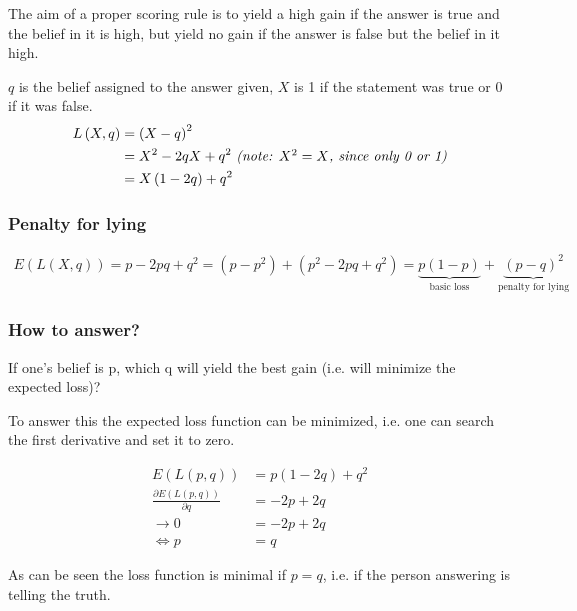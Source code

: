 \vspace{1em}

The aim of a proper scoring rule is to yield a high gain if the answer is true and the belief in it is high, but yield no gain if the answer is false but the belief in it high.

$q$ is the belief assigned to the answer given, $X$ is 1 if the statement was true or 0 if it was false.
\begin{align*}
L\left(X,q\right) &= \left(X-q\right)^2 \\
                  &= X^2-2qX+q^2 \mbox{ \textit{(note: $X^2 = X$, since only 0 or 1)}} \\
                  &= X\left(1-2q\right)+q^2
\end{align*}

\subsubsection*{Penalty for lying}

\begin{align*}
E\left(L\left(X,q\right)\right) = p-2pq+q^2 = \left(p-p^2\right) + \left(p^2-2pq+q^2\right) = \underbrace{p\left(1-p\right)}_\text{basic loss} + \underbrace{\left(p-q\right)^2}_\text{penalty for lying}
\end{align*}

\subsubsection*{How to answer?}
If one's belief is p, which q will yield the best gain (i.e. will minimize the expected loss)?

To answer this the expected loss function can be minimized, i.e. one can search the first derivative and set it to zero. 

\begin{align*}
E\left(L\left(p,q\right)\right) &= p\left(1-2q\right)+q^2 \\
\frac{\partial E\left(L\left(p,q\right)\right)}{\partial q} &= -2p + 2q \\
\rightarrow 0 &= -2p + 2q \\
\Leftrightarrow p &= q
\end{align*}

As can be seen the loss function is minimal if $p=q$, i.e. if the person answering is telling the truth.
